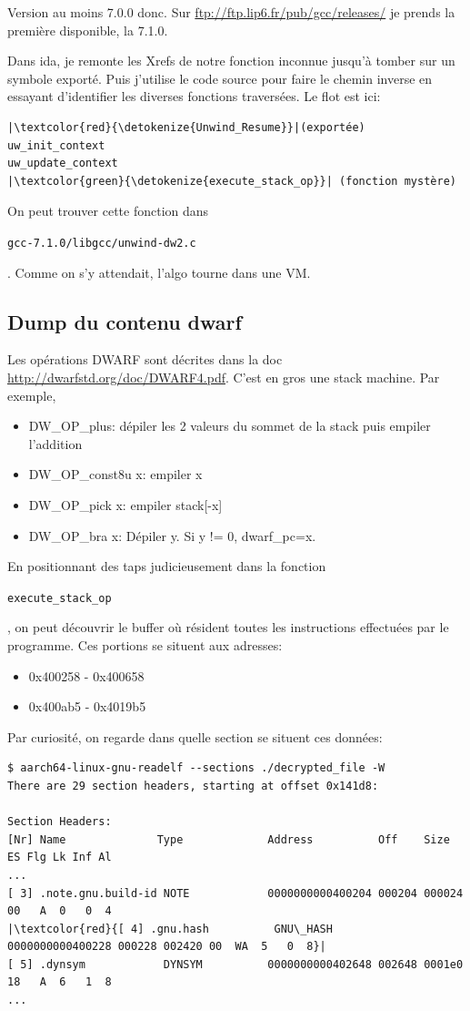 \documentclass[14pt]{article}
\newcommand{\inlinebox}[2]{%
\colorbox{bg}{%
\parbox[b][0.6em]{\widthof{\texttt{#2}}}{\texttt{#2}}
}
}
\newcommand{\inlinec}[1]{ \inlinebox{c}{#1} }
\newcommand{\filename}[1]{ \inlinebox{bash}{#1} }
\theoremstyle{definition}
\begin{document}
Version au moins 7.0.0 donc. Sur \url{ftp://ftp.lip6.fr/pub/gcc/releases/} je prends la première disponible, la 7.1.0.


Dans ida, je remonte les Xrefs de notre fonction inconnue jusqu'à tomber sur un symbole exporté. Puis j'utilise le code source pour faire le chemin inverse en essayant d'identifier les diverses fonctions traversées. Le flot est ici:

\begin{verbatim}
|\textcolor{red}{\detokenize{Unwind_Resume}}|(exportée)
uw_init_context
uw_update_context
|\textcolor{green}{\detokenize{execute_stack_op}}| (fonction mystère)
\end{verbatim}

On peut trouver cette fonction dans \filename{gcc-7.1.0/libgcc/unwind-dw2.c}. Comme on s'y attendait, l'algo tourne dans une VM.

\subsection{Dump du contenu dwarf}

Les opérations DWARF sont décrites dans la doc \url{http://dwarfstd.org/doc/DWARF4.pdf}.
C'est en gros une stack machine. Par exemple,
\begin{itemize}
    \item DW\_OP\_plus:  dépiler les 2 valeurs du sommet de la stack puis empiler l'addition
    \item DW\_OP\_const8u x: empiler x
    \item DW\_OP\_pick x: empiler stack[-x]
    \item DW\_OP\_bra x: Dépiler y. Si y != 0, dwarf\_pc=x.
\end{itemize}


En positionnant des taps judicieusement dans la fonction \inlinec{execute_stack_op}, on peut découvrir le buffer où résident toutes les instructions effectuées par le programme.
Ces portions se situent aux adresses:
\begin{itemize}
    \item 0x400258 - 0x400658
    \item 0x400ab5 - 0x4019b5
\end{itemize}

Par curiosité, on regarde dans quelle section se situent ces données:
\begin{verbatim}
$ aarch64-linux-gnu-readelf --sections ./decrypted_file -W
There are 29 section headers, starting at offset 0x141d8:

Section Headers:
[Nr] Name              Type             Address          Off    Size   ES Flg Lk Inf Al
...
[ 3] .note.gnu.build-id NOTE            0000000000400204 000204 000024 00   A  0   0  4
|\textcolor{red}{[ 4] .gnu.hash          GNU\_HASH        0000000000400228 000228 002420 00  WA  5   0  8}|
[ 5] .dynsym            DYNSYM          0000000000402648 002648 0001e0 18   A  6   1  8
...
\end{verbatim}
\end{document}

